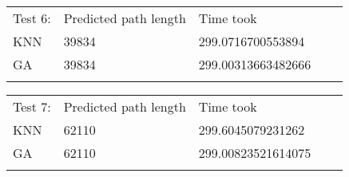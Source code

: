 \documentclass[onecolumn, draftclsnofoot,10pt, compsoc]{IEEEtran}
\begin{document}
\begin{table}[]
\begin{tabular}{lllll}
\cline{1-3}
\multicolumn{1}{|l|}{Test 6:}    & \multicolumn{1}{l|}{Predicted path length} & \multicolumn{1}{l|}{Time took} &  &  \\ \cline{1-3}
\multicolumn{1}{|l|}{KNN} & \multicolumn{1}{l|}{39834}                      & \multicolumn{1}{l|}{299.0716700553894}          &  &  \\ \cline{1-3}
\multicolumn{1}{|l|}{GA}  & \multicolumn{1}{l|}{39834}                      & \multicolumn{1}{l|}{299.00313663482666}          &  &  \\ \cline{1-3}
                          &                                            &                                &  & 
\end{tabular}
\end{table}
\begin{table}[]
\begin{tabular}{lllll}
\cline{1-3}
\multicolumn{1}{|l|}{Test 7:}    & \multicolumn{1}{l|}{Predicted path length} & \multicolumn{1}{l|}{Time took} &  &  \\ \cline{1-3}
\multicolumn{1}{|l|}{KNN} & \multicolumn{1}{l|}{62110}                      & \multicolumn{1}{l|}{299.6045079231262}          &  &  \\ \cline{1-3}
\multicolumn{1}{|l|}{GA}  & \multicolumn{1}{l|}{62110}                      & \multicolumn{1}{l|}{299.00823521614075}          &  &  \\ \cline{1-3}
                          &                                            &                                &  & 
\end{tabular}
\end{table}
\end{document}
